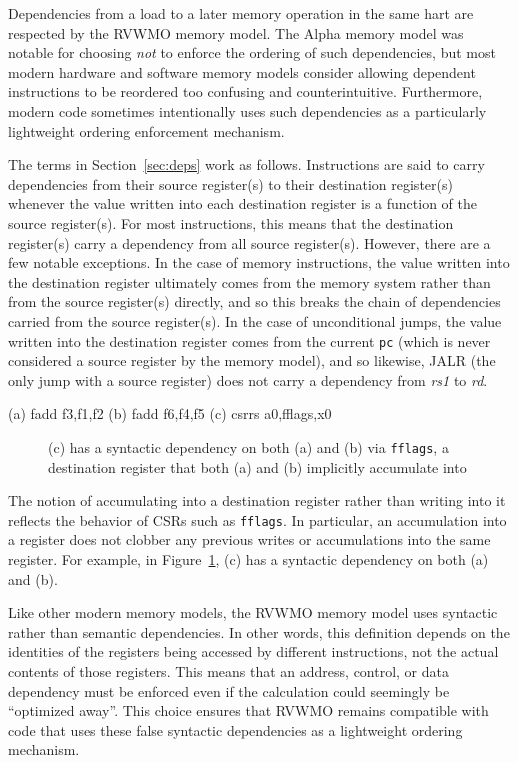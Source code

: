 Dependencies from a load to a later memory operation in the same hart are respected by the RVWMO memory model.
The Alpha memory model was notable for choosing {\em not} to enforce the ordering of such dependencies, but most modern hardware and software memory models consider allowing dependent instructions to be reordered too confusing and counterintuitive.
Furthermore, modern code sometimes intentionally uses such dependencies as a particularly lightweight ordering enforcement mechanism.

The terms in Section~\ref{sec:deps} work as follows.
Instructions are said to carry dependencies from their source register(s) to their destination register(s) whenever the value written into each destination register is a function of the source register(s).
For most instructions, this means that the destination register(s) carry a dependency from all source register(s).
However, there are a few notable exceptions.
In the case of memory instructions, the value written into the destination register ultimately comes from the memory system rather than from the source register(s) directly, and so this breaks the chain of dependencies carried from the source register(s).
In the case of unconditional jumps, the value written into the destination register comes from the current {\tt pc} (which is never considered a source register by the memory model), and so likewise, JALR (the only jump with a source register) does not carry a dependency from {\em rs1} to {\em rd}.

\begin{verbbox}
(a) fadd  f3,f1,f2
(b) fadd  f6,f4,f5
(c) csrrs a0,fflags,x0
\end{verbbox}
\begin{figure}[h!]
  \centering\small
  \theverbbox
  \caption{(c) has a syntactic dependency on both (a) and (b) via {\tt fflags}, a destination register that both (a) and (b) implicitly accumulate into}
  \label{fig:litmus:fflags}
\end{figure}

The notion of accumulating into a destination register rather than writing into it reflects the behavior of CSRs such as {\tt fflags}.
In particular, an accumulation into a register does not clobber any previous writes or accumulations into the same register.
For example, in Figure~\ref{fig:litmus:fflags}, (c) has a syntactic dependency on both (a) and (b).

Like other modern memory models, the RVWMO memory model uses syntactic rather than semantic dependencies.
In other words, this definition depends on the identities of the
registers being accessed by different instructions, not the actual
contents of those registers.  This means that an address, control, or
data dependency must be enforced even if the calculation could seemingly
be ``optimized away''.
This choice ensures that RVWMO remains compatible with code that uses these false syntactic dependencies as a lightweight ordering mechanism.

